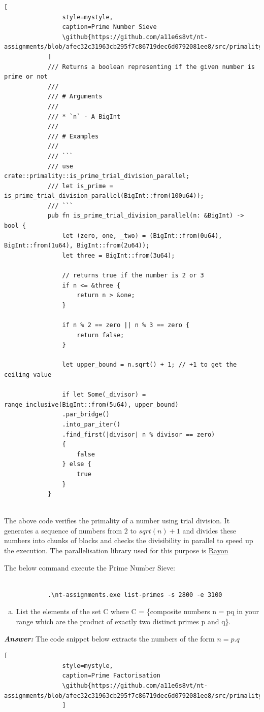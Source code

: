\documentclass[11pt,a4paper]{article}
\newcommand{\github}[1]{%
	\href{#1}{\faGithubSquare}%
}
\begin{document}
\begin{enumerate}[1.]
\begin{flushleft}
\begin{lstlisting}[
				style=mystyle,
				caption=Prime Number Sieve
				\github{https://github.com/a11e6s8vt/nt-assignments/blob/afec32c31963cb295f7c86719dec6d0792081ee8/src/primality.rs\#L57}
			]
			/// Returns a boolean representing if the given number is prime or not
			///
			/// # Arguments
			///
			/// * `n` - A BigInt
			///
			/// # Examples
			///
			/// ```
			/// use crate::primality::is_prime_trial_division_parallel;
			/// let is_prime = is_prime_trial_division_parallel(BigInt::from(100u64));
			/// ```
			pub fn is_prime_trial_division_parallel(n: &BigInt) -> bool {
				let (zero, one, _two) = (BigInt::from(0u64), BigInt::from(1u64), BigInt::from(2u64));
				let three = BigInt::from(3u64);

				// returns true if the number is 2 or 3
				if n <= &three {
					return n > &one;
				}

				if n % 2 == zero || n % 3 == zero {
					return false;
				}

				let upper_bound = n.sqrt() + 1; // +1 to get the ceiling value

				if let Some(_divisor) = range_inclusive(BigInt::from(5u64), upper_bound)
				.par_bridge()
				.into_par_iter()
				.find_first(|divisor| n % divisor == zero)
				{
					false
				} else {
					true
				}
			}


			\end{lstlisting}

			The above code verifies the primality of a number using trial division. It generates a sequence of numbers from $2$ to $sqrt(n) + 1$ and divides these numbers into chunks of blocks and checks the divisibility in parallel to speed up the execution. The parallelisation library used for this purpose is \href{https://crates.io/crates/rayon}{Rayon}

			\bigbreak
			The below command execute the Prime Number Sieve:
			\begin{lstlisting}[style=DOS, caption=Example command - Prime Number Sieve]

			.\nt-assignments.exe list-primes -s 2800 -e 3100
			\end{lstlisting}
		\end{flushleft}

		\begin{enumerate}[(b)]
			\item List the elements of the set C where C = \{composite numbers n = pq in your range which are the product of exactly two distinct primes p and q\}.
		\end{enumerate}
		\begin{flushleft}
			\textbf{\textit{Answer:}} The code snippet below extracts the numbers of the form $n = p.q$
			\begin{lstlisting}[
				style=mystyle,
				caption=Prime Factorisation
				\github{https://github.com/a11e6s8vt/nt-assignments/blob/afec32c31963cb295f7c86719dec6d0792081ee8/src/primality.rs\#L57}
				]


\end{lstlisting}
\end{flushleft}
\end{enumerate}
\end{document}
